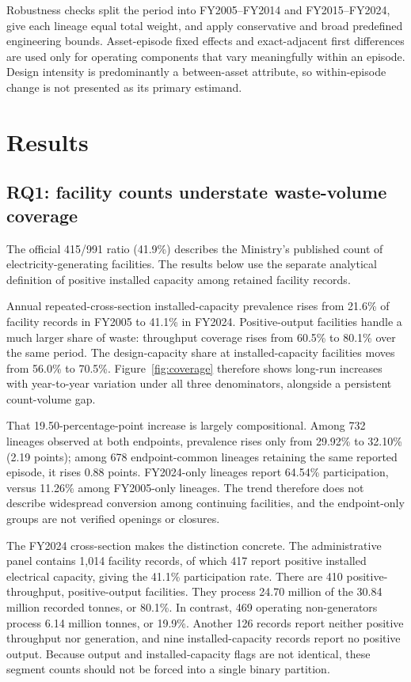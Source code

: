 \documentclass[11pt,letterpaper]{article}
\begin{document}
Robustness checks split the period into FY2005--FY2014 and FY2015--FY2024, give
each lineage equal total weight, and apply conservative and broad predefined
engineering bounds. Asset-episode fixed effects and exact-adjacent first
differences are used only for operating components that vary meaningfully
within an episode. Design intensity is predominantly a between-asset attribute,
so within-episode change is not presented as its primary estimand.

\section{Results}

\subsection{RQ1: facility counts understate waste-volume coverage}

The official 415/991 ratio (41.9\%) describes the Ministry's published count of
electricity-generating facilities. The results below use the separate analytical
definition of positive installed capacity among retained facility records.

Annual repeated-cross-section installed-capacity prevalence rises from 21.6\%
of facility records in FY2005 to 41.1\% in FY2024. Positive-output facilities handle a much
larger share of waste: throughput coverage rises from 60.5\% to 80.1\% over the
same period. The design-capacity share at installed-capacity facilities moves
from 56.0\% to 70.5\%. Figure~\ref{fig:coverage} therefore shows long-run
increases with year-to-year variation under all three denominators, alongside a
persistent count-volume gap.

That 19.50-percentage-point increase is largely compositional. Among 732
lineages observed at both endpoints, prevalence rises only from 29.92\% to
32.10\% (2.19 points); among 678 endpoint-common lineages retaining the same
reported episode, it rises 0.88 points. FY2024-only lineages report 64.54\%
participation, versus 11.26\% among FY2005-only lineages. The trend therefore
does not describe widespread conversion among continuing facilities, and the
endpoint-only groups are not verified openings or closures.

The FY2024 cross-section makes the distinction concrete. The administrative
panel contains 1,014 facility records, of which 417 report positive installed
electrical capacity, giving the 41.1\% participation rate. There are 410
positive-throughput, positive-output facilities. They process 24.70 million of
the 30.84 million recorded tonnes, or 80.1\%. In contrast, 469 operating
non-generators process 6.14 million tonnes, or 19.9\%. Another 126 records report
neither positive throughput nor generation, and nine installed-capacity records
report no positive output. Because output and installed-capacity flags are not
identical, these segment counts should not be forced into a single binary
partition.
\end{document}
